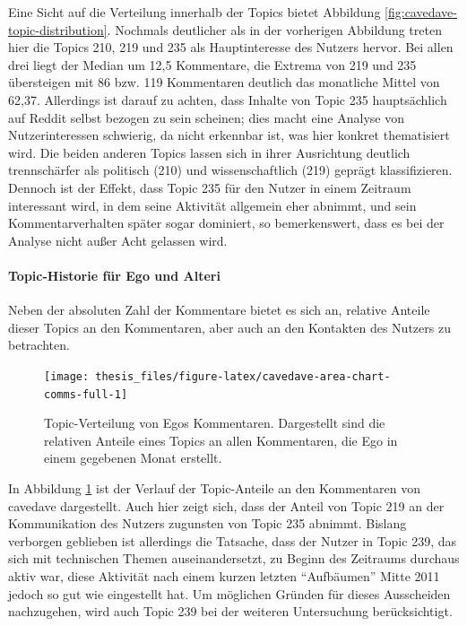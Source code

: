 \documentclass[11pt,a4paper,twoside]{article}
\let\oldpar\paragraph
\renewcommand{\paragraph}{\oldpar*}
\begin{document}
Eine Sicht auf die Verteilung innerhalb der Topics bietet Abbildung
\ref{fig:cavedave-topic-distribution}. Nochmals deutlicher als in der
vorherigen Abbildung treten hier die Topics 210, 219 und 235 als
Hauptinteresse des Nutzers hervor. Bei allen drei liegt der Median um
12,5 Kommentare, die Extrema von 219 und 235 übersteigen mit 86 bzw. 119
Kommentaren deutlich das monatliche Mittel von 62,37. Allerdings ist
darauf zu achten, dass Inhalte von Topic 235 hauptsächlich auf Reddit
selbst bezogen zu sein scheinen; dies macht eine Analyse von
Nutzerinteressen schwierig, da nicht erkennbar ist, was hier konkret
thematisiert wird. Die beiden anderen Topics lassen sich in ihrer
Ausrichtung deutlich trennschärfer als politisch (210) und
wissenschaftlich (219) geprägt klassifizieren. Dennoch ist der Effekt,
dass Topic 235 für den Nutzer in einem Zeitraum interessant wird, in dem
seine Aktivität allgemein eher abnimmt, und sein Kommentarverhalten
später sogar dominiert, so bemerkenswert, dass es bei der Analyse nicht
außer Acht gelassen wird.

\hypertarget{topic-historie-fur-ego-und-alteri}{%
\paragraph{Topic-Historie für Ego und
Alteri}\label{topic-historie-fur-ego-und-alteri}}

Neben der absoluten Zahl der Kommentare bietet es sich an, relative
Anteile dieser Topics an den Kommentaren, aber auch an den Kontakten des
Nutzers zu betrachten.





\begin{figure}

{\centering \texttt{[image: thesis\_files/figure-latex/cavedave-area-chart-comms-full-1]} 

}

\caption{Topic-Verteilung von Egos
Kommentaren. Dargestellt sind die relativen Anteile eines Topics an
allen Kommentaren, die Ego in einem gegebenen Monat erstellt.}\label{fig:cavedave-area-chart-comms-full}
\end{figure}

In Abbildung \ref{fig:cavedave-area-chart-comms-full} ist der Verlauf
der Topic-Anteile an den Kommentaren von cavedave dargestellt. Auch hier
zeigt sich, dass der Anteil von Topic 219 an der Kommunikation des
Nutzers zugunsten von Topic 235 abnimmt. Bislang verborgen geblieben ist
allerdings die Tatsache, dass der Nutzer in Topic 239, das sich mit
technischen Themen auseinandersetzt, zu Beginn des Zeitraums durchaus
aktiv war, diese Aktivität nach einem kurzen letzten \enquote{Aufbäumen}
Mitte 2011 jedoch so gut wie eingestellt hat. Um möglichen Gründen für
dieses Ausscheiden nachzugehen, wird auch Topic 239 bei der weiteren
Untersuchung berücksichtigt.
\end{document}
